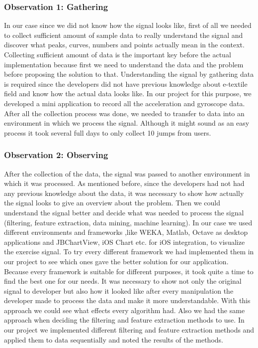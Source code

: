 \subsubsection{Observation 1: Gathering}


In our case since we did not know how the signal looks like, first of all we needed to collect sufficient amount of sample data to really understand the signal and discover what peaks, curves, numbers and points actually mean in the context. Collecting sufficient amount of data is the important key before the actual implementation because first we need to understand the data and the problem before proposing the solution to that. Understanding the signal by gathering data is required since the developers did not have previous knowledge about e-textile field and know how the actual data looks like. In our project for this purpose, we developed a mini application to record all the acceleration and gyroscope data. After all the collection process was done, we needed to transfer to data into an environment in which we process the signal. Although it might sound as an easy process it took several full days to only collect 10 jumps from users. 
	
	
\subsubsection{Observation 2: Observing}


After the collection of the data, the signal was passed to another environment in which it was processed. As mentioned before, since the developers had not had any previous knowledge about the data, it was necessary to show how actually the signal looks to give an overview about the problem. Then we could understand the signal better and decide what was needed to process the signal (filtering, feature extraction, data mining, machine learning). In our case we used different environments and frameworks ,like WEKA, Matlab, Octave as desktop applications and JBChartView, iOS Chart etc. for iOS integration, to visualize the exercise signal. To try every different framework we had implemented them in our project to see which ones gave the better solution for our application. Because every framework is suitable for different purposes, it took quite a time to find the best one for our needs. It was necessary to show not only the original signal to developer but also how it looked like after every manipulation the developer made to process the data and make it more understandable. With this approach we could see what effects every algorithm had. Also we had the same approach when deciding the filtering and feature extraction methods to use. In our project we implemented different filtering and feature extraction methods and applied them to data sequentially and noted the results of the methods.


